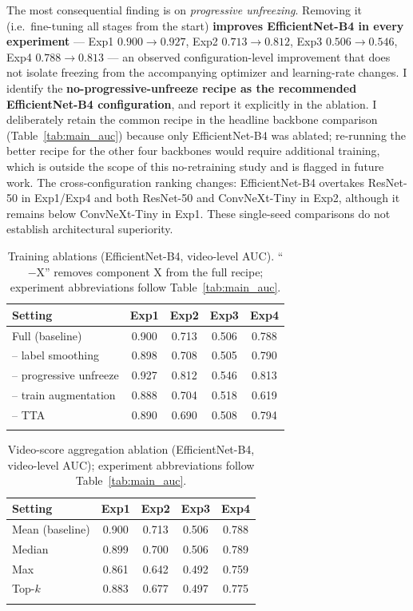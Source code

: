 The most consequential finding is on \emph{progressive unfreezing}. Removing it (i.e.\ fine-tuning all stages from the start) \textbf{improves EfficientNet-B4 in every experiment} --- Exp1 $0.900\!\to\!0.927$, Exp2 $0.713\!\to\!0.812$, Exp3 $0.506\!\to\!0.546$, Exp4 $0.788\!\to\!0.813$ --- an observed configuration-level improvement that does not isolate freezing from the accompanying optimizer and learning-rate changes. I identify the \textbf{no-progressive-unfreeze recipe as the recommended EfficientNet-B4 configuration}, and report it explicitly in the ablation. I deliberately retain the common recipe in the headline backbone comparison (Table~\ref{tab:main_auc}) because only EfficientNet-B4 was ablated; re-running the better recipe for the other four backbones would require additional training, which is outside the scope of this no-retraining study and is flagged in future work. The cross-configuration ranking changes: EfficientNet-B4 overtakes ResNet-50 in Exp1/Exp4 and both ResNet-50 and ConvNeXt-Tiny in Exp2, although it remains below ConvNeXt-Tiny in Exp1. These single-seed comparisons do not establish architectural superiority.

\begin{table}[!htbp]
\caption{Training ablations (EfficientNet-B4, video-level AUC). ``$-$X'' removes component X from the full recipe; experiment abbreviations follow Table~\ref{tab:main_auc}.}
\centering
\small
\setlength{\tabcolsep}{3pt}
{\renewcommand{\arraystretch}{1.08}
\begin{tabular}{l cccc}
\toprule
\textbf{Setting} & \textbf{Exp1} & \textbf{Exp2} & \textbf{Exp3} & \textbf{Exp4} \\
\midrule
Full (baseline) & 0.900 & 0.713 & 0.506 & 0.788 \\
-- label smoothing & 0.898 & 0.708 & 0.505 & 0.790 \\
-- progressive unfreeze & 0.927 & 0.812 & 0.546 & 0.813 \\
-- train augmentation & 0.888 & 0.704 & 0.518 & 0.619 \\
-- TTA & 0.890 & 0.690 & 0.508 & 0.794 \\
\botrule
\end{tabular}}
\label{tab:ablation}
\end{table}

\begin{table}[!htbp]
\caption{Video-score aggregation ablation (EfficientNet-B4, video-level AUC); experiment abbreviations follow Table~\ref{tab:main_auc}.}
\centering
\small
\setlength{\tabcolsep}{3pt}
{\renewcommand{\arraystretch}{1.08}
\begin{tabular}{l cccc}
\toprule
\textbf{Setting} & \textbf{Exp1} & \textbf{Exp2} & \textbf{Exp3} & \textbf{Exp4} \\
\midrule
Mean (baseline) & 0.900 & 0.713 & 0.506 & 0.788 \\
Median & 0.899 & 0.700 & 0.506 & 0.789 \\
Max & 0.861 & 0.642 & 0.492 & 0.759 \\
Top-$k$ & 0.883 & 0.677 & 0.497 & 0.775 \\
\botrule
\end{tabular}}
\label{tab:agg}
\end{table}

